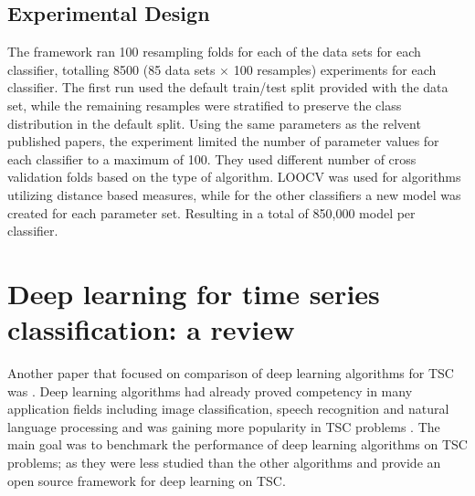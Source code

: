 \subsection{Experimental Design}
\label{subsectionUniBakeoffExperiment}
The framework ran 100 resampling folds for each of the data sets for each classifier, totalling 8500 (85 data sets $\times$ 100 resamples) experiments for each classifier.
The first run used the default train/test split provided with the data set, while the remaining resamples were stratified to preserve the class distribution in the default split.
Using the same parameters as the relvent published papers, the experiment limited the number of parameter values for each classifier to a maximum of 100.
They used different number of cross validation folds based on the type of algorithm. LOOCV was used for algorithms utilizing distance based measures,
while for the other classifiers a new model was created for each parameter set. Resulting in a total of 850,000 model per classifier.

\section{Deep learning for time series classification: a review}
\label{DeepLearningReview}
Another paper that focused on comparison of deep learning algorithms for TSC was \cite{fawaz2019deepreview}.
Deep learning algorithms had already proved competency in many application fields including image classification, speech recognition and natural language processing \cite{he2016deep,santos2016literature,krizhevsky2012imagenet,guan2019towards}
and was gaining more popularity in TSC problems \cite{zheng2014time,zheng2016exploiting,zhao2017convolutional}.
The main goal was to benchmark the performance of deep learning algorithms on TSC problems; as they were less studied than the other algorithms and provide an open source framework for deep learning on TSC.

